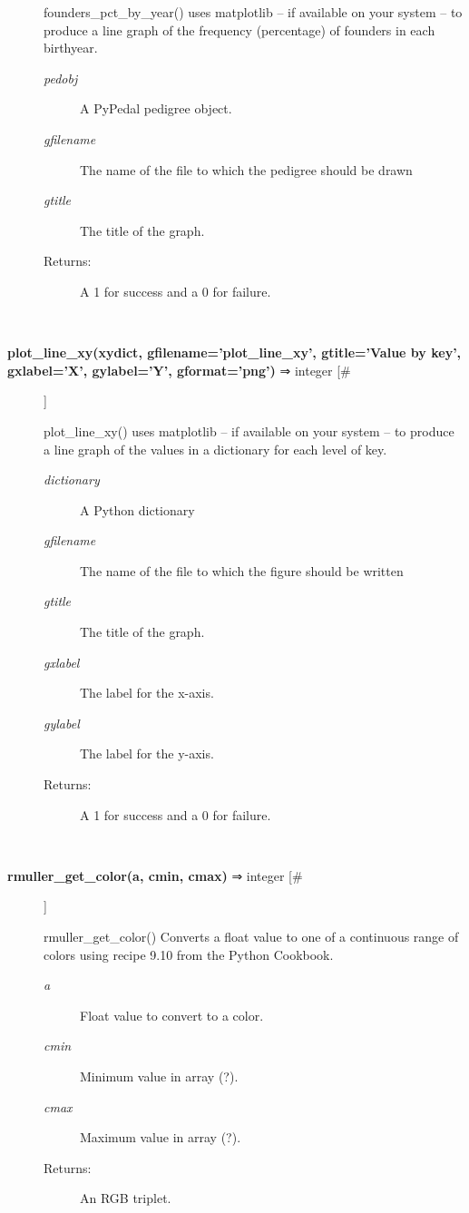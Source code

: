 \documentclass[10pt]{article}
\begin{document}
\begin{description}
 founders\_pct\_by\_year() uses matplotlib -- if available on your system -- to produce a line graph of the frequency (percentage) of founders in each birthyear.
\begin{description}
\item[\emph{pedobj}
] A PyPedal pedigree object.
\item[\emph{gfilename}
] The name of the file to which the pedigree should be drawn
\item[\emph{gtitle}
] The title of the graph.
\item[Returns:] A 1 for success and a 0 for failure.

\end{description}
\\ 

\item[\textbf{plot\_line\_xy(xydict, gfilename='plot\_line\_xy', gtitle='Value by key', gxlabel='X', gylabel='Y', gformat='png')}
 ⇒ integer [\#]]

 plot\_line\_xy() uses matplotlib -- if available on your system -- to produce a line graph of the values in a dictionary for each level of key.
\begin{description}
\item[\emph{dictionary}
] A Python dictionary
\item[\emph{gfilename}
] The name of the file to which the figure should be written
\item[\emph{gtitle}
] The title of the graph.
\item[\emph{gxlabel}
] The label for the x-axis.
\item[\emph{gylabel}
] The label for the y-axis.
\item[Returns:] A 1 for success and a 0 for failure.

\end{description}
\\ 

\item[\textbf{rmuller\_get\_color(a, cmin, cmax)}
 ⇒ integer [\#]]

 rmuller\_get\_color() Converts a float value to one of a continuous range of colors using recipe 9.10 from the Python Cookbook.
\begin{description}
\item[\emph{a}
] Float value to convert to a color.
\item[\emph{cmin}
] Minimum value in array (?).
\item[\emph{cmax}
] Maximum value in array (?).
\item[Returns:] An RGB triplet.


\end{description}
\end{description}
\end{document}
